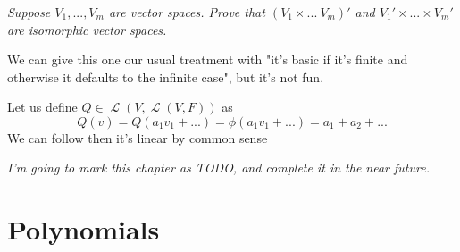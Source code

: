 \documentclass[11pt,oneside,titlepage]{book}
\DeclareMathOperator \map {\mathcal {L}}
\begin{document}
\subsection{}


\textit{Suppose $V_1, ..., V_m$ are vector spaces. Prove that $(V_1 \times  ... \ V_m)'$
  and $V_1' \times ... \times V_m'$ are isomorphic vector spaces.}

We can give this one our usual treatment with "it's basic if it's finite and otherwise it
defaults to the infinite case", but it's not fun.

Let us define $Q \in \map(V, \map(V, F))$ as
$$Q(v) = Q(a_1 v_1 + ...) = \phi(a_1 v_1 + ... ) = a_1 + a_2 + ... $$
We can follow then it's linear by common sense


\textit{I'm going to mark this chapter as TODO, and complete it in the near
future.}


\chapter{Polynomials}
\end{document}
